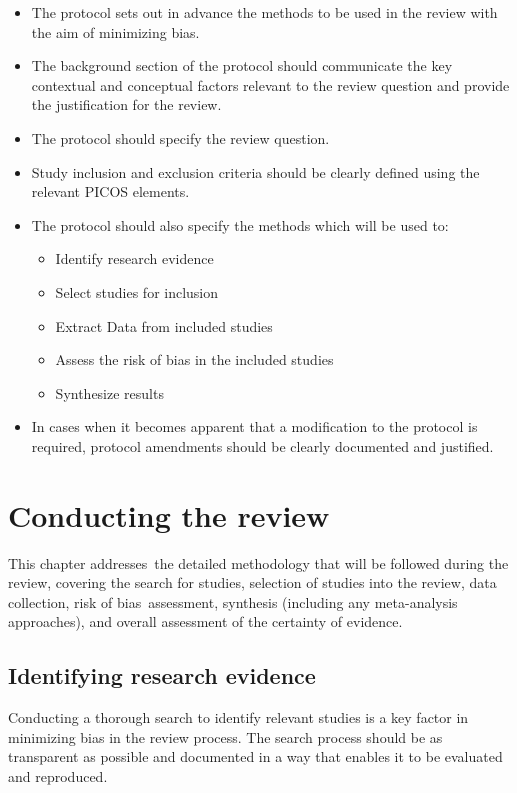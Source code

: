 \documentclass[
  11pt,
  a4paper,
  DIV=11,
  numbers=noendperiod]{scrreprt}
\begin{document}
\begin{itemize}
\item
  The protocol sets out in advance the methods to be used in the review
  with the aim of minimizing bias.
\item
  The background section of the protocol should communicate the key
  contextual and conceptual factors relevant to the review question and
  provide the justification for the review.
\item
  The protocol should specify the review question.
\item
  Study inclusion and exclusion criteria should be clearly defined using
  the relevant PICOS elements.
\item
  The protocol should also specify the methods which will be used to:

  \begin{itemize}
  \item
    Identify research evidence
  \item
    Select studies for inclusion
  \item
    Extract Data from included studies
  \item
    Assess the risk of bias in the included studies
  \item
    Synthesize results
  \end{itemize}
\item
  In cases when it becomes apparent that a modification to the protocol
  is required, protocol amendments should be clearly documented and
  justified.
\end{itemize}

\chapter{Conducting the
review}\label{sec-conducting-systematic-reviews-of-interventions}

This chapter addresses~the detailed methodology that will be followed
during the review, covering the search for studies, selection of studies
into the review, data collection, risk of bias~assessment, synthesis
(including any meta-analysis approaches), and overall assessment of the
certainty of evidence.~

\section{Identifying research
evidence}\label{identifying-research-evidence}

Conducting a thorough search to identify relevant studies is a key
factor in minimizing bias in the review process. The search process
should be as transparent as possible and documented in a way that
enables it to be evaluated and reproduced.
\end{document}
